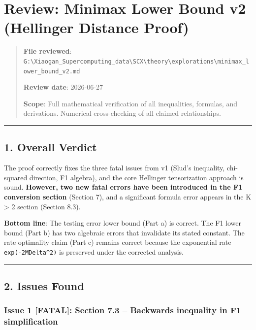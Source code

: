 \documentclass[
  12pt,
]{ctexart}
\author{SCX}
\date{2026}
\begin{document}
\section{Review: Minimax Lower Bound v2 (Hellinger Distance
Proof)}\label{review-minimax-lower-bound-v2-hellinger-distance-proof}

\begin{quote}
\textbf{File reviewed}:
\texttt{G:\textbackslash{}Xiaogan\_Supercomputing\_data\textbackslash{}SCX\textbackslash{}theory\textbackslash{}explorations\textbackslash{}minimax\_lower\_bound\_v2.md}

\textbf{Review date}: 2026-06-27

\textbf{Scope}: Full mathematical verification of all inequalities,
formulas, and derivations. Numerical cross-checking of all claimed
relationships.
\end{quote}

\begin{center}\rule{0.5\linewidth}{0.5pt}\end{center}

\subsection{1. Overall Verdict}\label{overall-verdict}

The proof correctly fixes the three fatal issues from v1 (Slud's
inequality, chi-squared direction, F1 algebra), and the core Hellinger
tensorization approach is sound. \textbf{However, two new fatal errors
have been introduced in the F1 conversion section} (Section 7), and a
significant formula error appears in the K \textgreater{} 2 section
(Section 8.3).

\textbf{Bottom line}: The testing error lower bound (Part a) is correct.
The F1 lower bound (Part b) has two algebraic errors that invalidate its
stated constant. The rate optimality claim (Part c) remains correct
because the exponential rate \texttt{exp(-2MDelta\^{}2)} is preserved
under the corrected analysis.

\begin{center}\rule{0.5\linewidth}{0.5pt}\end{center}

\subsection{2. Issues Found}\label{issues-found}

\subsubsection{Issue 1 {[}FATAL{]}: Section 7.3 -- Backwards inequality
in F1
simplification}\label{issue-1-fatal-section-7.3-backwards-inequality-in-f1-simplification}
\end{document}
